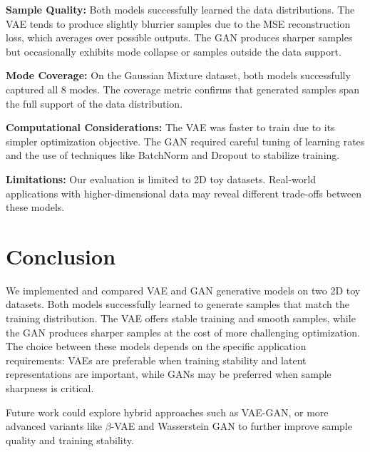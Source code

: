 \documentclass[11pt]{article}
\begin{document}
\textbf{Sample Quality:} Both models successfully learned the data distributions. The VAE tends to produce slightly blurrier samples due to the MSE reconstruction loss, which averages over possible outputs. The GAN produces sharper samples but occasionally exhibits mode collapse or samples outside the data support.

\textbf{Mode Coverage:} On the Gaussian Mixture dataset, both models successfully captured all 8 modes. The coverage metric confirms that generated samples span the full support of the data distribution.

\textbf{Computational Considerations:} The VAE was faster to train due to its simpler optimization objective. The GAN required careful tuning of learning rates and the use of techniques like BatchNorm and Dropout to stabilize training.

\textbf{Limitations:} Our evaluation is limited to 2D toy datasets. Real-world applications with higher-dimensional data may reveal different trade-offs between these models.

\section{Conclusion}

We implemented and compared VAE and GAN generative models on two 2D toy datasets. Both models successfully learned to generate samples that match the training distribution. The VAE offers stable training and smooth samples, while the GAN produces sharper samples at the cost of more challenging optimization. The choice between these models depends on the specific application requirements: VAEs are preferable when training stability and latent representations are important, while GANs may be preferred when sample sharpness is critical.

Future work could explore hybrid approaches such as VAE-GAN, or more advanced variants like $\beta$-VAE and Wasserstein GAN to further improve sample quality and training stability.
\end{document}

